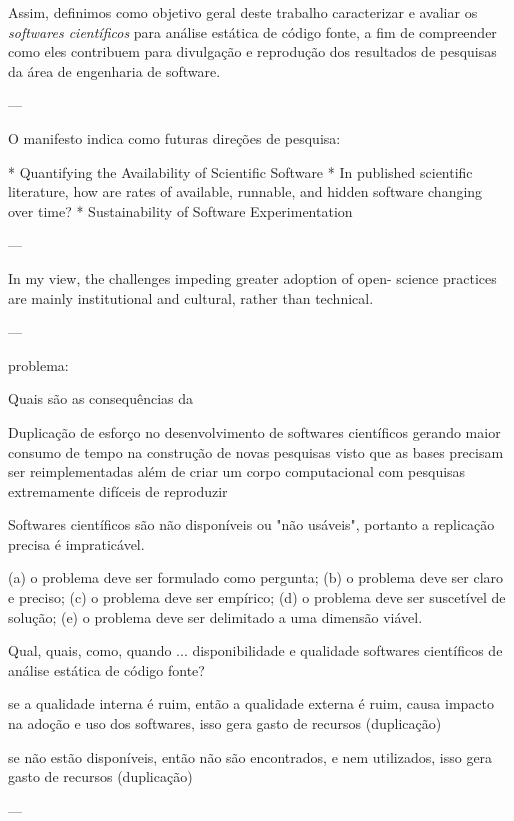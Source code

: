 Assim, definimos como objetivo geral deste trabalho caracterizar e avaliar os
{\it softwares científicos} para análise estática de código fonte, a fim de
compreender como eles contribuem para divulgação e reprodução dos resultados de
pesquisas da área de engenharia de software.

---

O manifesto indica como futuras direções de pesquisa:

* Quantifying the Availability of Scientific Software
  * In published scientific literature, how are rates of available, runnable,
    and hidden software changing over time?
* Sustainability of Software Experimentation

---

In my view, the challenges impeding greater adoption of open-
science practices are mainly institutional and cultural, rather than
technical.

---

problema:

Quais são as consequências da 

Duplicação de esforço no desenvolvimento de softwares científicos gerando maior
consumo de tempo na construção de novas pesquisas visto que as bases precisam
ser reimplementadas além de criar um corpo computacional com pesquisas
extremamente difíceis de reproduzir

Softwares científicos são não disponíveis ou "não usáveis", portanto
a replicação precisa é impraticável.


(a) o problema deve ser formulado como pergunta;
(b) o problema deve ser claro e preciso;
(c) o problema deve ser empírico;
(d) o problema deve ser suscetível de solução;
(e) o problema deve ser delimitado a uma dimensão viável.

Qual, quais, como, quando ... disponibilidade e qualidade softwares científicos de análise estática de código fonte?

se a qualidade interna é ruim,
    então a qualidade externa é ruim,
        causa impacto na adoção e uso dos softwares,
            isso gera gasto de recursos (duplicação)

se não estão disponíveis,
    então não são encontrados,
        e nem utilizados,
            isso gera gasto de recursos (duplicação)

---

